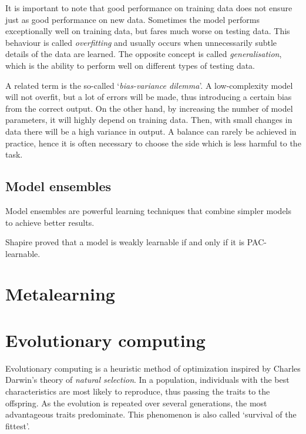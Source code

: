 It is important to note that good performance on training data does not ensure 
just as good performance on new data. Sometimes the model performs 
exceptionally well on training data, but fares much worse on testing data. 
This behaviour is called \textit{overfitting} and usually occurs when 
unnecessarily subtle details of the data are learned. The opposite concept 
is called \textit{generalisation}, which is the ability to perform well on 
different types of testing data.

A related term is the so-called `\textit{bias-variance dilemma}'. A 
low-complexity model will not overfit, but a lot of errors will be made, thus 
introducing a certain bias from the correct output. On the other hand, by 
increasing the number of model parameters, it will highly depend on training 
data. Then, with small changes in data there will be a high variance in 
output. A balance can rarely be achieved in practice, hence it is often 
necessary to choose the side which is less harmful to the task.

\subsection{Model ensembles}
Model ensembles are powerful learning techniques that combine simpler models 
to achieve better results. 

Shapire proved that a model is weakly learnable if and only if it is
PAC-learnable. \cite{Schapire:1990:SWL:83637.83645}
\section{Metalearning}


\section{Evolutionary computing}
Evolutionary computing is a heuristic method of optimization inspired by 
Charles Darwin's theory of \textit{natural selection}. \cite{darwin} In 
a population, individuals with the best characteristics are most likely
to reproduce, thus passing the traits to the offspring. As the evolution 
is repeated over several generations, the most advantageous traits 
predominate. This phenomenon is also called `survival of the fittest'. 

